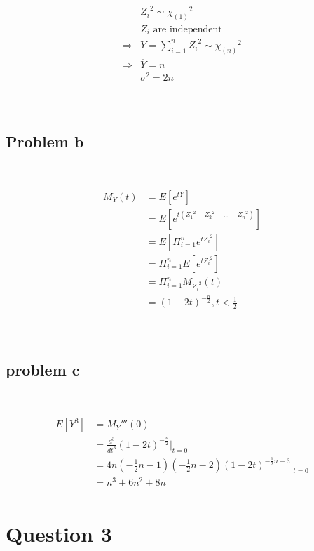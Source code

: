 \documentclass{article}
\begin{document}
~

\begin{align*}
    &{Z_i}^2\sim {\chi_{(1)}}^2\\
    &Z_i\text{ are independent}\\
    \Rightarrow&Y=\sum_{i=1}^{n}{Z_i}^2\sim{\chi_{(n)}}^2\\
    \Rightarrow&\overline{Y}=n\\
    &\sigma^2=2n\\
\end{align*}

~

\subsection*{Problem b}

~

\begin{align*}
    M_Y(t)&=E[e^{tY}]\\
    &=E[e^{t({Z_1}^2+{Z_2}^2+...+{Z_n}^2)}]\\
    &=E[\Pi^{n}_{i=1}e^{t{Z_i}^2}]\\
    &=\Pi^{n}_{i=1}E[e^{t{Z_i}^2}]\\
    &=\Pi^{n}_{i=1}M_{{Z_i}^2}(t)\\
    &=(1-2t)^{-\frac{n}{2}},t<\frac{1}{2}\\
\end{align*}

~

\subsection*{problem c}

~

\begin{align*}
    E[Y^3]&={M_Y}'''(0)\\
    &=\frac{d^3}{dt^3}(1-2t)^{-\frac{n}{2}}|_{t=0}\\
    &=4n(-\frac{1}{2}n-1)(-\frac{1}{2}n-2)(1-2t)^{-\frac{1}{2}n-3}|_{t=0}\\
    &=n^3+6n^2+8n\\
\end{align*}

\newpage

\section*{Question 3}

~
\end{document}
